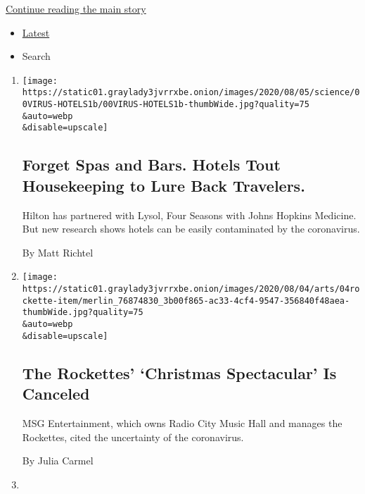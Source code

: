 \protect\hyperlink{after-mid1}{Continue reading the main story}

\begin{itemize}
\tightlist
\item
  \protect\hyperlink{stream-panel}{Latest}
\item
  Search
\end{itemize}

\begin{enumerate}
\def\labelenumi{\arabic{enumi}.}
\item
  \href{/2020/08/04/health/coronavirus-hotels-infect.html}{}

  \texttt{[image: https://static01.graylady3jvrrxbe.onion/images/2020/08/05/science/00VIRUS-HOTELS1b/00VIRUS-HOTELS1b-thumbWide.jpg?quality=75\\\&auto=webp\\\&disable=upscale]}

  \hypertarget{forget-spas-and-bars-hotels-tout-housekeeping-to-lure-back-travelers}{%
  \subsection{Forget Spas and Bars. Hotels Tout Housekeeping to Lure
  Back
  Travelers.}\label{forget-spas-and-bars-hotels-tout-housekeeping-to-lure-back-travelers}}

  Hilton has partnered with Lysol, Four Seasons with Johns Hopkins
  Medicine. But new research shows hotels can be easily contaminated by
  the coronavirus.

  By Matt Richtel
\item
  \href{/2020/08/04/theater/radio-city-rockettes-christmas-canceled.html}{}

  \texttt{[image: https://static01.graylady3jvrrxbe.onion/images/2020/08/04/arts/04rockette-item/merlin\_76874830\_3b00f865-ac33-4cf4-9547-356840f48aea-thumbWide.jpg?quality=75\\\&auto=webp\\\&disable=upscale]}

  \hypertarget{the-rockettes-christmas-spectacular-is-canceled}{%
  \subsection{The Rockettes' `Christmas Spectacular' Is
  Canceled}\label{the-rockettes-christmas-spectacular-is-canceled}}

  MSG Entertainment, which owns Radio City Music Hall and manages the
  Rockettes, cited the uncertainty of the coronavirus.

  By Julia Carmel
\item
  \href{/2020/08/04/dining/nyc-restaurant-news.html}{}


\end{enumerate}
